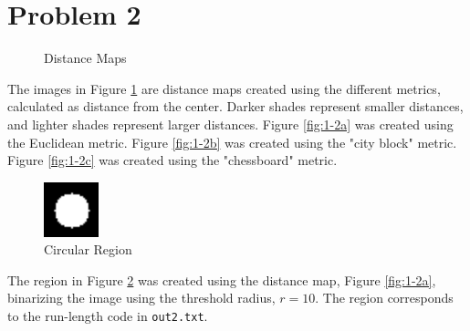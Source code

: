 \documentclass[aps,letterpaper,10pt]{article}
\begin{document}
\section{Problem 2}
\begin{figure}[!h]
\centering
{}\hfill
{}\hfill
{}
\caption{Distance Maps}
\label{1-2}
\end{figure}
The images in Figure \ref{1-2} are distance maps created using the different metrics, calculated as distance from the center.  Darker shades represent smaller distances, and lighter shades represent larger distances.  Figure \ref{fig:1-2a} was created using the Euclidean metric. Figure \ref{fig:1-2b} was created using the "city block" metric.  Figure \ref{fig:1-2c} was created using the "chessboard" metric.
\begin{figure}[!h]
\centering
\includegraphics[width=60px]{1-2d.png}
\caption{Circular Region}
\label{fig:1-2d}
\end{figure} 

The region in Figure \ref{fig:1-2d} was created using the distance map, Figure \ref{fig:1-2a}, binarizing the image using the threshold radius, $r=10$. The region corresponds to the run-length code in \texttt{out2.txt}.



\newpage
\end{document}
